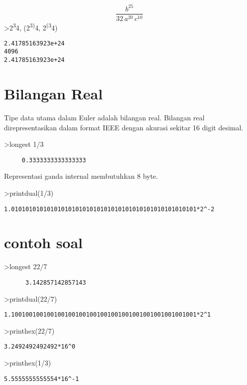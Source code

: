 \documentclass[
]{book}
\begin{document}
\[\frac{b^{25}}{32\,a^{20}\,c^{10}}\]\textgreater2\textsuperscript{3}4, (2\textsuperscript{3)}4, 2\textsuperscript{(3}4)

\begin{verbatim}
2.41785163923e+24
4096
2.41785163923e+24
\end{verbatim}

\section{Bilangan Real}\label{bilangan-real}

Tipe data utama dalam Euler adalah bilangan real. Bilangan real direpresentasikan dalam format IEEE dengan akurasi sekitar 16 digit desimal.

\textgreater longest 1/3

\begin{verbatim}
     0.3333333333333333 
\end{verbatim}

Representasi ganda internal membutuhkan 8 byte.

\textgreater printdual(1/3)

\begin{verbatim}
1.0101010101010101010101010101010101010101010101010101*2^-2
\end{verbatim}

\section{contoh soal}\label{contoh-soal-1}

\textgreater longest 22/7

\begin{verbatim}
      3.142857142857143 
\end{verbatim}

\textgreater printdual(22/7)

\begin{verbatim}
1.1001001001001001001001001001001001001001001001001001*2^1
\end{verbatim}

\textgreater printhex(22/7)

\begin{verbatim}
3.2492492492492*16^0
\end{verbatim}

\textgreater printhex(1/3)

\begin{verbatim}
5.5555555555554*16^-1
\end{verbatim}
\end{document}
